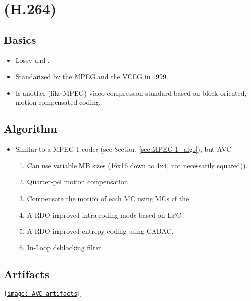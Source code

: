 \chapter{ (H.264)}

\section{Basics}
\begin{itemize}
\item Lossy and .
\item Standarized by the \gls{MPEG} and the \gls{VCEG} in 1999.
\item Is another (like \gls{MPEG}) video compression standard based on
  block-oriented, motion-compensated coding.
\end{itemize}

\section{Algorithm}
\label{sec:MPEG-4_AVC_algo}
\begin{itemize}
\item Similar to a MPEG-1 codec (see Section~\ref{sec:MPEG-1_algo}),
  but \gls{AVC}:
\begin{enumerate}
\item Can use variable MB sizes (16x16 down to 4x4, not
  necessarily squared)).
\item
  \href{https://en.wikipedia.org/wiki/Motion_compensation}{Quarter-pel
    motion compensation}.
\item Compensate the motion of each MC using MCs of the
  .
\item A \gls{RDO}-improved intra coding mode based on \gls{LPC}.
\item A \gls{RDO}-improved entropy coding using \gls{CABAC}.
\item In-Loop deblocking filter.
\end{enumerate}
\end{itemize}

\section{Artifacts}
\begin{center}
  \href{https://www.sciencedirect.com/science/article/pii/B9780124157606000167}{\texttt{[image: AVC\_artifacts]}}
\end{center}
